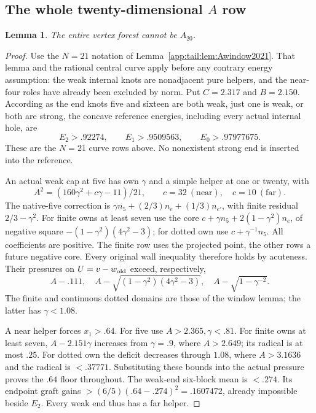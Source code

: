 \documentclass[11pt]{article}
\newtheorem{lemma}[theorem]{Lemma}
\theoremstyle{definition}
\theoremstyle{remark}
\begin{document}
\subsection{The whole twenty-dimensional $A$ row}
\begin{lemma}\label{app:tail:lem:wholeA20}
The entire vertex forest cannot be $A_{20}$.
\end{lemma}
\begin{proof}
Use the $N=21$ notation of Lemma~\ref{app:tail:lem:Awindow2021}.
That lemma and the rational central curve apply before any contrary
energy assumption: the weak internal knots are nonadjacent pure
helpers, and the near-four roles have already been excluded by norm.
Put $C=2.317$ and $B=2.150$. According as the end knots five and
sixteen are both weak, just one is weak, or both are strong, the
concave reference energies, including every actual internal hole, are
\[
 E_2>.92274,\qquad E_1>.9509563,\qquad E_0>.97977675.
\]
These are the $N=21$ curve rows above. No nonexistent strong end
is inserted into the reference.

An actual weak cap at five has own $\gamma$ and a simple helper
at one or twenty, with
\[
 A^2=(160\gamma^2+c\gamma-11)/21,
 \qquad c=32\ (\text{near}),\quad c=10\ (\text{far}).
\]
The native-five correction is
$\gamma n_5+(2/3)n_e+(1/3)n_{e'}$, with finite residual
$2/3-\gamma^2$. For finite owns at least seven use the core
$c+\gamma n_5+2(1-\gamma^2)n_e$, of negative square
$-(1-\gamma^2)(4\gamma^2-3)$; for dotted own use
$c+\gamma^{-1}n_5$. All coefficients are positive.
The finite row uses the projected point, the other rows a future
negative core. Every original wall inequality therefore holds by
acuteness. Their pressures on $U=v-w_{\rm old}$ exceed, respectively,
\[
 A-.111,\quad A-\sqrt{(1-\gamma^2)(4\gamma^2-3)},\quad
 A-\sqrt{1-\gamma^{-2}}.
\]
The finite and continuous dotted domains are those of the window
lemma; the latter has $\gamma<1.08$.

A near helper forces $x_1>.64$. For five use $A>2.365,\gamma<.81$.
For finite owns at least seven, $A-2.151\gamma$ increases from
$\gamma=.9$, where $A>2.649$; its radical is at most $.25$.
For dotted own the deficit decreases through $1.08$, where
$A>3.1636$ and the radical is $<.37771$.
Substituting these bounds into the actual pressure proves the
$.64$ floor throughout. The weak-end six-block mean is $<.274$.
Its endpoint graft gains $>(6/5)(.64-.274)^2=.1607472$, already
impossible beside $E_2$. Every weak end thus has a far helper.


\end{proof}
\end{document}
